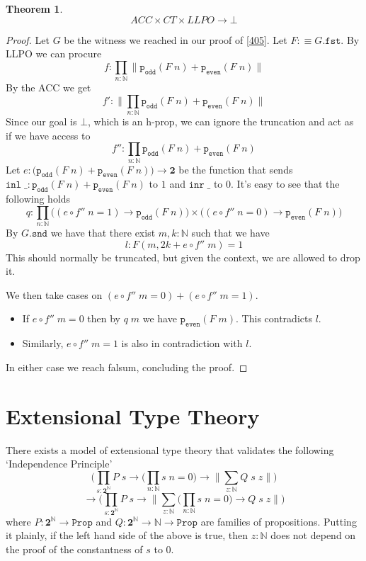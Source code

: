 \documentclass[12pt]{report}
\newtheorem{thm}{Theorem}[section]
\begin{document}
\begin{thm}
$$ACC \times CT \times LLPO \rightarrow \bot$$
\end{thm}
\begin{proof}
Let $G$ be the witness we reached in our proof of \cref{405}. 
Let $F :\equiv G.\mathtt{fst}$. 
By LLPO we can procure 
$$f : \prod_{n : \mathbb{N}} \lVert \mathtt{p_{odd}}(F\; n) + \mathtt{p_{even}}(F\;n) \rVert$$
By the ACC we get
$$f' : \big\lVert \prod_{n : \mathbb{N}}  \mathtt{p_{odd}}(F\; n) + \mathtt{p_{even}}(F\;n) \big\rVert$$
Since our goal is $\bot$, which is an h-prop, we can ignore the truncation and act as if we have access to
$$f'' : \prod_{n : \mathbb{N}}  \mathtt{p_{odd}}(F\; n) + \mathtt{p_{even}}(F\;n)$$
Let $e : \big( \mathtt{p_{odd}}(F\; n) + \mathtt{p_{even}}(F\;n)\big) \rightarrow \mathbf{2}$ be the function that sends $\mathtt{inl}\; \_ : \mathtt{p_{odd}}(F\; n) + \mathtt{p_{even}}(F\;n)$
to $1$ and $\mathtt{inr}\; \_$ to $0$. 
It's easy to see that the following holds
$$q : \prod_{n : \mathbb{N}} \big( (e\circ f''\; n = 1) \rightarrow \mathtt{p_{odd}}(F\; n) \big) \times \big( (e\circ f''\; n = 0) \rightarrow \mathtt{p_{even}}(F\; n) \big)$$
By $G.\mathtt{snd}$ we have that there exist $m,k : \mathbb{N}$ such that we have 
$$l : F(m, 2k + e\circ f''\; m) = 1$$
This should normally be truncated, but given the context, we are allowed to drop it. 

We then take cases on $(e\circ f''\; m = 0) + (e\circ f''\; m = 1)$. 
\begin{itemize}
	\item If $e\circ f''\; m = 0$ then by $q\; m$ we have $\mathtt{p_{even}}(F\; m)$. 
	This contradicts $l$. 
	\item Similarly, $e\circ f''\; m = 1$ is also in contradiction with $l$.
\end{itemize}
In either case we reach falsum, concluding the proof.
\end{proof}

\chapter{Extensional Type Theory}
There exists a model of extensional type theory that validates the following `Independence Principle'
$$\bigg( \prod_{s : \mathbf{2}^\mathbb{N}} P\; s \rightarrow \Big(\prod_{n : \mathbb{N}}s\; n = 0 \Big) \rightarrow \Big\lVert \sum_{z : \mathbb{N}} Q\; s\; z \Big\rVert \bigg)$$
$$\rightarrow \bigg( \prod_{s : \mathbf{2}^\mathbb{N}} P\; s \rightarrow  \Big\lVert \sum_{z : \mathbb{N}} \Big(\prod_{n : \mathbb{N}}s\; n = 0 \Big) \rightarrow Q \; s\; z\Big\rVert \bigg)$$
where $P: \mathbf{2}^\mathbb{N} \rightarrow \mathtt{Prop}$ and $Q : \mathbf{2}^\mathbb{N} \rightarrow \mathbb{N} \rightarrow \mathtt{Prop} $ are families of propositions. 
Putting it plainly, if the left hand side of the above is true, then $z : \mathbb{N}$ does not depend on the proof of the constantness of $s$ to $0$.
\end{document}
